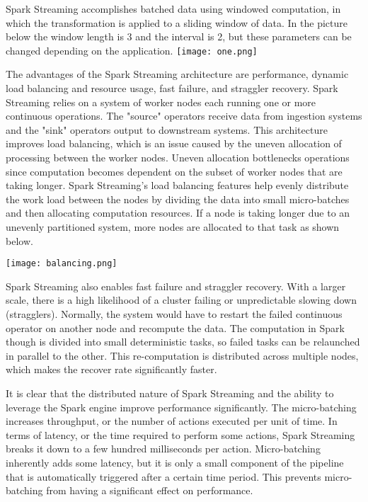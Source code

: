 \documentclass[9pt,twocolumn,twoside]{idsi}
\begin{document}
Spark Streaming accomplishes batched data using windowed computation, in which the transformation is applied to a sliding window of data. In the picture below the window length is 3 and the interval is 2, but these parameters can be changed depending on the application. 
\texttt{[image: one.png]}

The advantages of the Spark Streaming architecture are performance, dynamic load balancing and resource usage, fast failure, and straggler recovery. Spark Streaming relies on a system of worker nodes each running one or more continuous operations. The "source" operators receive data from ingestion systems and the "sink" operators output to downstream systems. 
	This architecture improves load balancing, which is an issue caused by the uneven allocation of processing between the worker nodes. Uneven allocation bottlenecks operations since computation becomes dependent on the subset of worker nodes that are taking longer. Spark Streaming's load balancing features help evenly distribute the work load between the nodes by dividing the data into small micro-batches and then allocating computation resources. If a node is taking longer due to an unevenly partitioned system, more nodes are allocated to that task as shown below. 
    
   \texttt{[image: balancing.png]}

Spark Streaming also enables fast failure and straggler recovery. With a larger scale, there is a high likelihood of a cluster failing or unpredictable slowing down (stragglers). Normally, the system would have to restart the failed continuous operator on another node and recompute the data. The computation in Spark though is divided into small deterministic tasks, so failed tasks can be relaunched in parallel to the other. This re-computation is distributed across multiple nodes, which makes the recover rate significantly faster. 

It is clear that the distributed nature of Spark Streaming and the ability to leverage the Spark engine improve performance significantly. The micro-batching increases throughput, or the number of actions executed per unit of time. In terms of latency, or the time required to perform some actions, Spark Streaming breaks it down to a few hundred milliseconds per action. Micro-batching inherently adds some latency, but it is only a small component of the pipeline that is automatically triggered after a certain time period. This prevents micro-batching from having a significant effect on performance.
\end{document}
